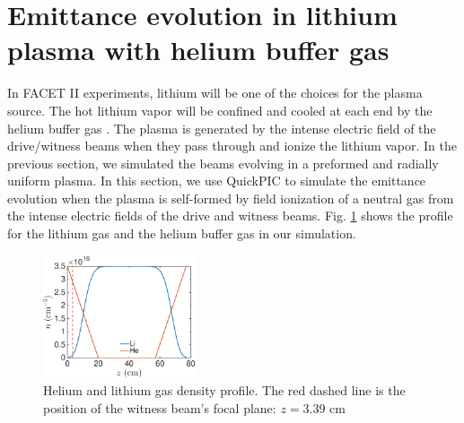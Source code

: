 \documentclass[%
reprint, superscriptaddress,
 amsmath,amssymb, aps,
prstab,
]{revtex4-2}
\begin{document}
\section{Emittance evolution in lithium plasma with helium buffer gas}
In FACET II experiments, lithium
 will be one of the choices for the plasma
source. The hot lithium vapor will be
confined and cooled at each end by the helium buffer gas \cite{PWFA2007,PWFA2014}.
 The plasma is generated by the intense electric field of the drive/witness beams
when they pass through and ionize the lithium vapor. In the previous
section, we simulated the beams evolving in a preformed and radially uniform plasma. In this
section, we use QuickPIC to simulate the emittance evolution when the plasma is self-formed by field ionization of a  neutral
gas from the intense electric fields of the drive and witness beams. Fig.
\ref{fig:he_buffer_profile} shows the profile for the lithium gas and
the helium buffer gas in our simulation. \begin{figure}[htbp] \centering
\includegraphics[width=0.4\textwidth]{Helium_buffer_profile.eps}
\caption{Helium and lithium gas density profile. The red dashed line is
the position of the witness beam's focal plane: $z=3.39$ cm}
\label{fig:he_buffer_profile} \end{figure}
\end{document}
